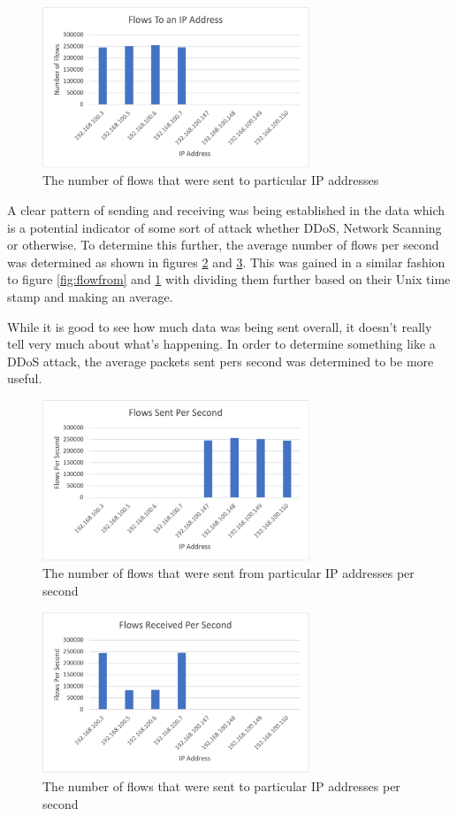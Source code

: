 \documentclass[conference]{IEEEtran}
\begin{document}
\begin{figure}[htbp]
    \includegraphics[width=8cm]{Figure2.png}
    \centering
    \caption{The number of flows that were sent to particular IP addresses}
    \label{fig:flowto}
\end{figure}

A clear pattern of sending and receiving was being established in the data which is a potential indicator of some
sort of attack whether DDoS, Network Scanning or otherwise. To determine this further, the average number of flows
per second was determined as shown in figures \ref{fig:sentfrompersec} and \ref{fig:senttopersec}. This was gained in
a similar fashion to figure \ref{fig:flowfrom} and \ref{fig:flowto} with dividing them further based on their Unix
time stamp and making an average.

While it is good to see how much data was being sent overall, it doesn't really tell very much about what's happening.
In order to determine something like a DDoS attack, the average packets sent pers second was determined to be more useful.

\begin{figure}[htbp]
    \includegraphics[width=8cm]{Figure3.png}
    \centering
    \caption{The number of flows that were sent from particular IP addresses per second}
    \label{fig:sentfrompersec}
\end{figure}

\begin{figure}[htbp]
    \includegraphics[width=8cm]{Figure4.png}
    \centering
    \caption{The number of flows that were sent to particular IP addresses per second}
    \label{fig:senttopersec}
\end{figure}
\end{document}
